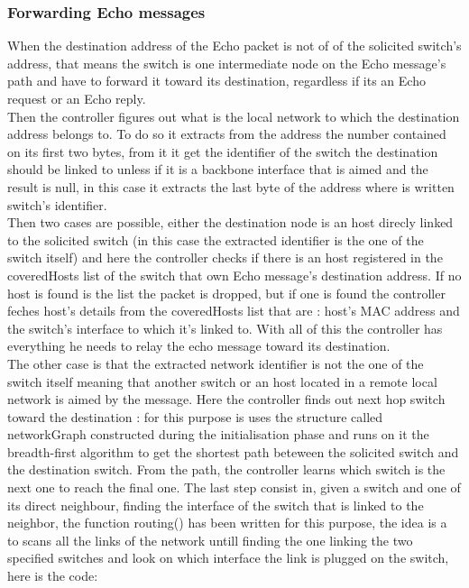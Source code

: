 \documentclass{article}
\begin{document}
\subsubsection{Forwarding Echo messages}

When the destination address of the Echo packet is not of of the
solicited switch's address, that means the switch is one intermediate
node on the Echo message's path and have to forward it toward its
destination, regardless if its an Echo request or an Echo reply.\\
\newline
Then the controller figures out what is the local network to which the
destination address belongs to. To do so it extracts from the address
the number contained on its first two bytes, from it it get the
identifier of the switch the destination should be linked to unless if
it is a backbone interface that is aimed and the result is null, in
this case it extracts the last byte of the address where is written
switch's identifier.\\
\newline
Then two cases are possible, either the destination node is an host
direcly linked to the solicited switch (in this case the extracted
identifier is the one of the switch itself) and here the controller
checks if there is an host registered in the coveredHosts list of the
switch that own Echo message's destination address. If no host is
found is the list the packet is dropped, but if one is found the
controller feches host's details from the coveredHosts list that are :
host's MAC address and the switch's interface to which it's linked
to. With all of this the controller has everything he needs to relay
the echo message toward its destination.\\
\newline
The other case is that the extracted network identifier is not the one
of the switch itself meaning that another switch or an host located in
a remote local network is aimed by the message. Here the controller
finds out next hop switch toward the destination : for this purpose is
uses the structure called networkGraph constructed during the
initialisation phase and runs on it the breadth-first algorithm to get
the shortest path beteween the solicited switch and the destination
switch. From the path, the controller learns which switch is the next
one to reach the final one. The last step consist in, given a switch
and one of its direct neighbour, finding the interface of the switch
that is linked to the neighbor, the function routing() has been
written for this purpose, the idea is a to scans all the links of the
network untill finding the one linking the two specified switches and
look on which interface the link is plugged on the switch, here is the
code:
\end{document}
